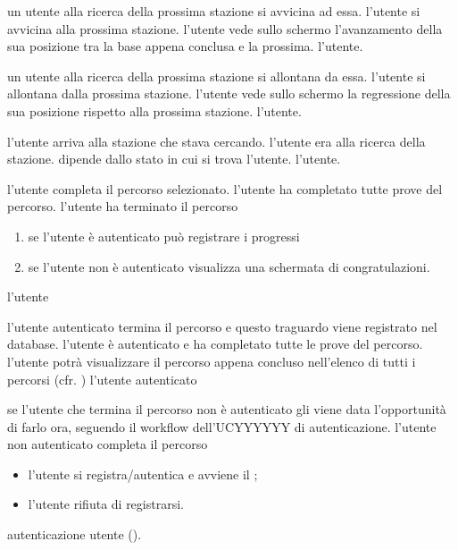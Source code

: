 \desc un utente alla ricerca della prossima stazione si avvicina ad essa.
\pre l'utente si avvicina alla prossima stazione.
\post l'utente vede sullo schermo l'avanzamento della sua posizione tra la base appena conclusa e la prossima.
\att l'utente.

\desc un utente alla ricerca della prossima stazione si allontana da essa.
\pre l'utente si allontana dalla prossima stazione.
\post l'utente vede sullo schermo la regressione della sua posizione rispetto alla prossima stazione.
\att l'utente.

\desc l'utente arriva alla stazione che stava cercando.
\pre l'utente era alla ricerca della stazione.
\post dipende dallo stato in cui si trova l'utente.
\att l'utente.

\desc l'utente completa il percorso selezionato.
\pre l'utente ha completato tutte prove del percorso.
\post l'utente ha terminato il percorso
\scen
  \begin{enumerate}
    \item \textbf{} se l'utente è autenticato può registrare i progressi
    \item \textbf{} se l'utente non è autenticato visualizza una schermata di congratulazioni.
  \end{enumerate}
\att l'utente

\desc l'utente autenticato termina il percorso e questo traguardo viene registrato nel database.
\pre l'utente è autenticato e ha completato tutte le prove del percorso.
\post l'utente potrà visualizzare il percorso appena concluso nell'elenco di tutti i percorsi (cfr. )
\att l'utente autenticato

\desc se l'utente che termina il percorso non è autenticato gli viene data l'opportunità di farlo ora, seguendo il workflow dell'UCYYYYYY di autenticazione.
\pre l'utente non autenticato completa il percorso
\scen
  \begin{itemize}
    \item l'utente si registra/autentica e avviene il ;
    \item l'utente rifiuta di registrarsi.
  \end{itemize}
\ext autenticazione utente ().
